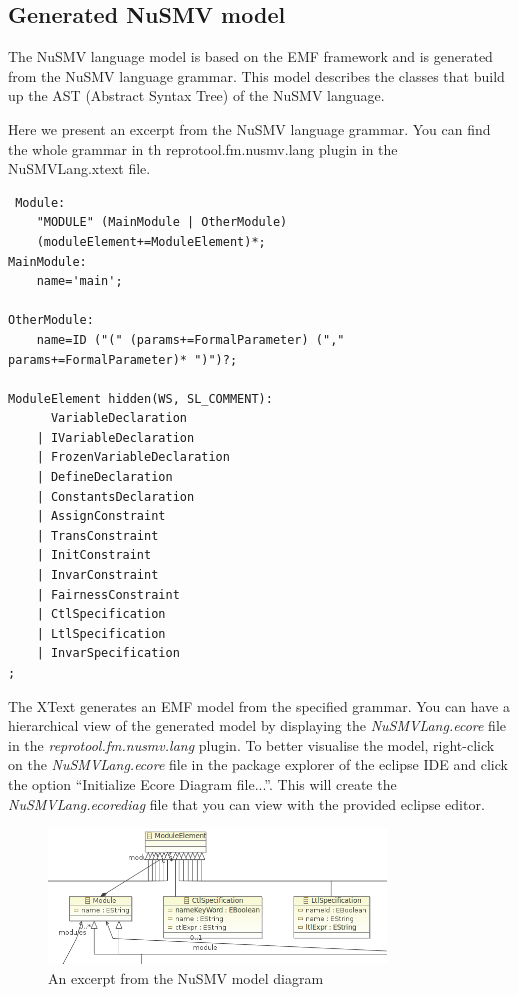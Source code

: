 \subsection{Generated NuSMV model}

The NuSMV language model is based on the EMF framework and is generated from the NuSMV language grammar.
This model describes the classes that build up the AST (Abstract Syntax Tree) of the NuSMV language.

Here we present an excerpt from the NuSMV language grammar. You can find the whole grammar in th
reprotool.fm.nusmv.lang plugin in the NuSMVLang.xtext file.

\begin{lstlisting}
 Module:
	"MODULE" (MainModule | OtherModule)
	(moduleElement+=ModuleElement)*;
MainModule:
	name='main';

OtherModule:
	name=ID ("(" (params+=FormalParameter) ("," params+=FormalParameter)* ")")?;

ModuleElement hidden(WS, SL_COMMENT):
	  VariableDeclaration
	| IVariableDeclaration
	| FrozenVariableDeclaration
	| DefineDeclaration
	| ConstantsDeclaration
	| AssignConstraint
	| TransConstraint
	| InitConstraint
	| InvarConstraint
	| FairnessConstraint
	| CtlSpecification
	| LtlSpecification
	| InvarSpecification
;
\end{lstlisting}

The XText generates an EMF model from the specified grammar. You can have a hierarchical view of the generated model by displaying the
\emph{NuSMVLang.ecore} file in the \emph{reprotool.fm.nusmv.lang} plugin. To better visualise the model, right-click on the \emph{NuSMVLang.ecore} file in
the package explorer of the eclipse IDE and click the option ``Initialize Ecore Diagram file...''. This will create the \emph{NuSMVLang.ecorediag} file that you can view with the provided eclipse editor.

\begin{figure}[ht]
  \centering
  \includegraphics[width=0.8\textwidth]{images/NuSmvLang}
  \caption{An excerpt from the NuSMV model diagram}
  \label{fig:NuSmvLang}
\end{figure}

